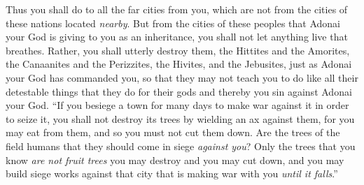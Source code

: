 \begin{biblechapter}
\verse Thus you shall do to all the far cities from you, which are not from the cities of these nations located \textit{nearby}.
\verse But from the cities of these peoples that Adonai your God is giving to you as an inheritance, you shall not let anything live that breathes.
\verse Rather, you shall utterly destroy them, the Hittites and the Amorites, the Canaanites and the Perizzites, the Hivites, and the Jebusites, just as Adonai your God has commanded you,
\verse so that they may not teach you to do like all their detestable things that they do for their gods and thereby you sin against Adonai your God.
\verse “If you besiege a town for many days to make war against it in order to seize it, you shall not destroy its trees by wielding an ax against them, for you may eat from them, and so you must not cut them down. Are the trees of the field humans that they should come in siege \textit{against you}?
\verse Only the trees that you know \textit{are not fruit trees} you may destroy and you may cut down, and you may build siege works against that city that is making war with you \textit{until it falls}.”
\end{biblechapter}

